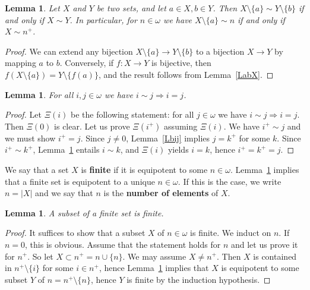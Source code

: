 \documentclass[12pt,letterpaper]{article}
\newtheorem{lem}[thm]{Lemma} %
\begin{document}
\begin{lem}\label{LabXY} 
Let \(X\) and \(Y\) be two sets, and let \(a\in X,b\in Y\). Then \(X\setminus\{a\}\sim Y\setminus\{b\}\) if and only if \(X\sim Y\). In particular, for \(n\in\omega\) we have \(X\setminus\{a\}\sim n\) if and only if \(X\sim n^+\).
\end{lem} 
\begin{proof} 
We can extend any bijection \(X\setminus\{a\}\to Y\setminus\{b\}\) to a bijection \(X\to Y\) by mapping \(a\) to \(b\). Conversely, if \(f:X\to Y\) is bijective, then \(f(X\setminus\{a\})=Y\setminus\{f(a)\}\), and the result follows from Lemma~\ref{LabX}. 
\end{proof} 

\begin{lem}\label{Lbasic} 
For all \(i,j\in\omega\) we have \(i\sim j\Rightarrow i=j\). 
\end{lem} 
\begin{proof} 
Let \(\Xi(i)\) be the following statement: for all \(j\in\omega\) we have \(i\sim j\Rightarrow i=j\). Then \(\Xi(0)\) is clear. Let us prove \(\Xi(i^+)\) assuming \(\Xi(i)\). We have \(i^+\sim j\) and we must show \(i^+=j\). Since \(j\ne0\), Lemma~\ref{Lbij} implies \(j=k^+\) for some \(k\). Since \(i^+\sim k^+\), Lemma~\ref{LabXY} entails \(i\sim k\), and \(\Xi(i)\) yields \(i=k\), hence \(i^+=k^+=j\). 
\end{proof} 

We say that a set \(X\) is \textbf{finite} if it is equipotent to some \(n\in\omega\). Lemma~\ref{Lbasic} implies that a finite set is equipotent to a unique \(n\in\omega\). If this is the case, we write \(n=|X|\) and we say that \(n\) is the \textbf{number of elements} of \(X\). 

\begin{lem}\label{Lsubset} 
A subset of a finite set is finite. 
\end{lem} 
\begin{proof} 
It suffices to show that a subset \(X\) of \(n\in\omega\) is finite. We induct on \(n\). If \(n=0\), this is obvious. Assume that the statement holds for \(n\) and let us prove it for \(n^+\). So let \(X\subset n^+=n\cup\{n\}\). We may assume \(X\ne n^+\). Then \(X\) is contained in \(n^+\setminus\{i\}\) for some \(i\in n^+\), hence Lemma~\ref{LabXY} implies that \(X\) is equipotent to some subset \(Y\) of \(n=n^+\setminus\{n\}\), hence \(Y\) is finite by the induction hypothesis. 
\end{proof} 
\end{document}
